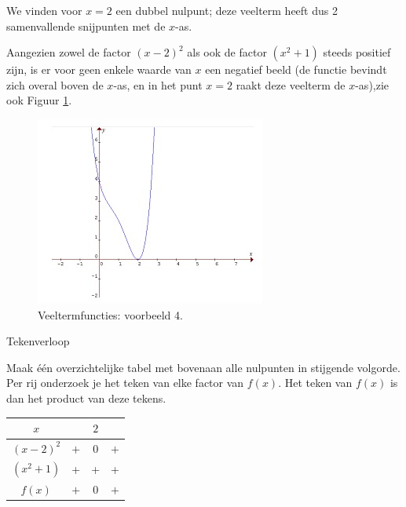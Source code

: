 \begin{voorbeeld}
We vinden voor $x=2$ een dubbel nulpunt; deze veelterm
heeft dus 2 samenvallende snijpunten met de $x$-as.

Aangezien zowel de factor $(x-2)^{2}$ als ook de factor
$(x^{2}+1)$ steeds positief zijn, is er voor geen enkele waarde van
$x$ een negatief beeld (de functie bevindt zich overal boven de $x$-as,
en in het punt $x=2$ raakt deze veelterm de $x$-as),zie ook Figuur \ref{fig:vt:vb4}.

\begin{figure}[h]
\centering{}\includegraphics[width=.6\linewidth]{2_elem_rekenvaardigheden_B/inputs/veeltermfuncties4.jpg} 
\caption{Veeltermfuncties: voorbeeld 4.}
\label{fig:vt:vb4}
\end{figure}


Tekenverloop

Maak \'e\'en overzichtelijke tabel met bovenaan alle nulpunten
in stijgende volgorde. Per rij onderzoek je het teken van elke factor
van $f(x)$. Het teken van $f(x)$ is dan het product van deze tekens.

\begin{center}
\begin{tabular}{c||ccc}
$x$ &  & $2$ & \\
\hline 
$(x-2)^{2}$ & $+$ & $0$ & \multicolumn{1}{c}{$+$}\\
$(x^{2}+1)$ & +&+&+\\
\hline 
$f(x)$ & $+$ & $0$ & $+$\\
\end{tabular}
\par\end{center}

\end{voorbeeld}